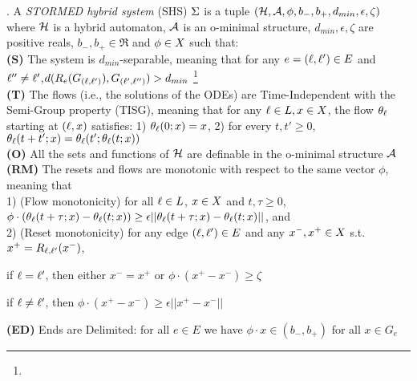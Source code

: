 \begin{defn}\cite{VladimerouPVD08_STORMED}.
	\label{defn:stormed system}	
	A \emph{STORMED hybrid system} (SHS) $\Sigma$ is a tuple $(\mathcal{H},\mathcal{A}, \phi,b_-,b_+, d_{min}, \epsilon,\zeta)$ where $\mathcal{H}$ is a hybrid automaton, $\mathcal{A}$ is an o-minimal structure, $d_{min}, \epsilon, \zeta$ are positive reals, $b_-,b_+ \in \Re$ and $\phi \in X$ such that:
	\\
	\textbf{(S)} The system is $d_{min}$-separable, meaning that for any $e=(\ell, \ell ')\in E$ and $\ell ''\neq \ell'$,$d(R_e(G_{(\ell ,\ell ')}), G_{(\ell' ,\ell '')})>d_{min}$
	\footnote{}
	\\
	\textbf{(T)} The flows (i.e., the solutions of the ODEs) are Time-Independent with the Semi-Group property (TISG), meaning that for any $\ell \in L, x \in X$, the flow $\theta_\ell$ starting at $(\ell , x)$ satisfies: 1) $\theta_{\ell}(0;x) = x$, 2) for every $t,t' \geq 0$, $\theta_{\ell}(t+t';x) = \theta_{\ell}(t'; \theta_\ell(t;x))$
	\\
	\textbf{(O)} All the sets and functions of $\mathcal{H}$ are definable in the o-minimal structure $\mathcal{A}$
	\\
	\textbf{(RM)} The resets and flows are monotonic with respect to the same vector $\phi$, meaning that \\
	1) (Flow monotonicity) for all $\ell \in L$, $x \in X$ and $t,\tau \geq 0$, $\phi \cdot (\theta_\ell (t+\tau;x) - \theta_\ell (t;x) ) \geq \epsilon ||\theta_\ell (t+\tau;x) - \theta_\ell (t;x) ||$, 
	and \\
	2) (Reset monotonicity) for any edge $(\ell,\ell') \in E$ and any $x^-,x^+ \in X$ s.t. $x^+ = R_{\ell ,\ell'}(x^-)$, 
	\begin{compactenum}
		\item if $\ell = \ell'$, then either $x^-=x^+$ or $\phi \cdot (x^+-x^-)\geq \zeta$
		\item if $\ell \neq \ell'$, then $\phi\cdot (x^+-x^-) \geq \epsilon ||x^+-x^-||$
	\end{compactenum}

	\textbf{(ED)} Ends are Delimited: for all $e \in E$ we have $\phi \cdot x \in (b_- , b_+)$ for all $x \in G_{e}$
\end{defn}
